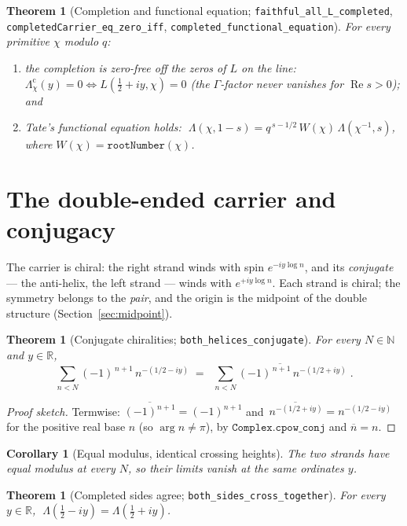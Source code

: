 \documentclass[11pt]{article}
\newtheorem{theorem}[definition]{Theorem}
\newtheorem{corollary}[definition]{Corollary}
\DeclareMathOperator{\Ree}{Re}
\DeclareMathOperator{\arglocal}{arg}
\newcommand{\R}{\mathbb{R}}
\newcommand{\N}{\mathbb{N}}
\newcommand{\conj}[1]{\overline{#1}}
\newcommand{\code}[1]{\texttt{#1}}
\begin{document}
\begin{theorem}[Completion and functional equation; \code{faithful\_all\_L\_completed}, \code{completedCarrier\_eq\_zero\_iff}, \code{completed\_functional\_equation}]\label{thm:tate}
For every \emph{primitive} $\chi$ modulo $q$:
\begin{enumerate}[label=\textup{(\roman*)}]
\item the completion is zero-free off the zeros of $L$ on the line: $\Lambda_\chi^{\mathrm{c}}(y)=0
\iff L(\tfrac12+iy,\chi)=0$ (the $\Gamma$-factor never vanishes for $\Ree s>0$); and
\item Tate's functional equation \cite{Tate1967} holds:
$\;\Lambda(\chi,1-s)=q^{\,s-1/2}\,W(\chi)\,\Lambda(\chi^{-1},s)$,
where $W(\chi)=\code{rootNumber}(\chi)$.
\end{enumerate}
\end{theorem}

\section{The double-ended carrier and conjugacy}\label{sec:double}

The carrier is chiral: the right strand winds with spin $e^{-iy\log n}$, and its \emph{conjugate}
--- the anti-helix, the left strand --- winds with $e^{+iy\log n}$.  Each strand is chiral; the
symmetry belongs to the \emph{pair}, and the origin is the midpoint of the double structure
(Section~\ref{sec:midpoint}).

\begin{theorem}[Conjugate chiralities; \code{both\_helices\_conjugate}]\label{thm:conjhelix}
For every $N\in\N$ and $y\in\R$,
\[
  \sum_{n<N}(-1)^{\,n+1}\,n^{-(1/2-iy)}
   \;=\; \conj{\;\sum_{n<N}(-1)^{\,n+1}\,n^{-(1/2+iy)}\;}.
\]
\end{theorem}

\begin{proof}[Proof sketch]
Termwise: $\conj{(-1)^{n+1}}=(-1)^{n+1}$ and $\conj{\,n^{-(1/2+iy)}}=n^{-(1/2-iy)}$ for the positive
real base $n$ (so $\arglocal n\neq\pi$), by $\code{Complex.cpow\_conj}$ and $\conj n=n$.
\end{proof}

\begin{corollary}[Equal modulus, identical crossing heights]\label{cor:equalmod}
The two strands have equal modulus at every $N$, so their limits vanish at the same ordinates $y$.
\end{corollary}

\begin{theorem}[Completed sides agree; \code{both\_sides\_cross\_together}]\label{thm:bothsides}
For every $y\in\R$, $\;\Lambda(\tfrac12-iy)=\Lambda(\tfrac12+iy)$.
\end{theorem}
\end{document}
